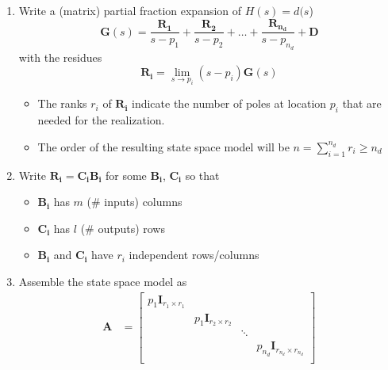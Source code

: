 \newpar{}
\begin{enumerate}
    \item Write a (matrix) partial fraction expansion of $H(s)=d(s$)
          \begin{equation*}
              \mathbf{G}(s)=\frac{\mathbf{R_1}}{s-p_1}+\frac{\mathbf{R_2}}{s-p_2}+\ldots+\frac{\mathbf{R_{n_d}}}{s-p_{n_d}}+\mathbf{D}
          \end{equation*} with the residues
          \begin{equation*}
              \mathbf{R_i}=\lim_{s\to p_i}(s-p_i)\mathbf{G}(s)
          \end{equation*}
          \begin{itemize}
              \item The ranks $r_i$ of $\mathbf{R_i}$ indicate the number of poles at location $p_i$ that are needed for the realization.
              \item The order of the resulting state space model will be $n=\sum_{i=1}^{n_d}r_i\geq n_d$
          \end{itemize}
    \item Write $\mathbf{R_i}=\mathbf{C_i B_i}$ for some $\mathbf{B_i}$, $\mathbf{C_i}$ so that
          \begin{itemize}
              \item $\mathbf{B_i}$ has $m$ (\# inputs) columns
              \item $\mathbf{C_i}$ has $l$ (\# outputs) rows
              \item $\mathbf{B_i}$ and $\mathbf{C_i}$ have $r_i$ independent rows/columns
          \end{itemize}
    \item Assemble the state space model as
          \begin{align*}
              \mathbf{A} & =\begin{bmatrix}
                                p_1 \mathbf{I}_{r_1\times r_1} &                                &        &                                            \\
                                                               & p_1 \mathbf{I}_{r_2\times r_2} &        &                                            \\
                                                               &                                & \ddots &                                            \\
                                                               &                                &        & p_{n_d} \mathbf{I}_{r_{n_d}\times r_{n_d}} \\

\end{bmatrix}
\end{align*}
\end{enumerate}
